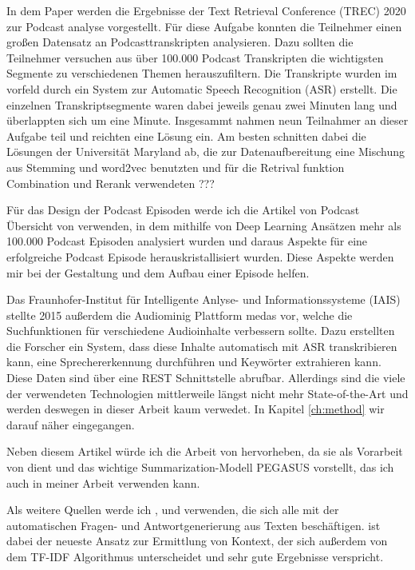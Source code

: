 In dem Paper \cite{jones2021} werden die Ergebnisse der Text Retrieval Conference (TREC) 2020 zur Podcast analyse vorgestellt.
Für diese Aufgabe konnten die Teilnehmer einen großen Datensatz an Podcasttranskripten analysieren.
Dazu sollten die Teilnehmer versuchen aus über 100.000 Podcast Transkripten die wichtigsten Segmente zu verschiedenen Themen herauszufiltern.
Die Transkripte wurden im vorfeld durch ein System zur Automatic Speech Recognition (ASR) erstellt.
Die einzelnen Transkriptsegmente waren dabei jeweils genau zwei Minuten lang und überlappten sich um eine Minute.
Insgesammt nahmen neun Teilnahmer an dieser Aufgabe teil und reichten eine Lösung ein.
Am besten schnitten dabei die Lösungen der Universität Maryland ab, die zur Datenaufbereitung eine  Mischung aus Stemming und word2vec benutzten und für die Retrival funktion Combination und Rerank verwendeten ???



Für das Design der Podcast Episoden werde ich die Artikel von Podcast Übersicht von \cite{jones2021} verwenden, in dem mithilfe von Deep Learning Ansätzen mehr als 100.000 Podcast Episoden analysiert wurden und daraus Aspekte für eine erfolgreiche Podcast Episode herauskristallisiert wurden. Diese Aspekte werden mir bei der Gestaltung und dem Aufbau einer Episode helfen. 


Das Fraunhofer-Institut für Intelligente Anlyse- und Informationssysteme (IAIS) stellte 2015 außerdem die Audiominig Plattform medas vor, welche die Suchfunktionen für verschiedene Audioinhalte verbessern sollte.
Dazu erstellten die Forscher ein System, dass diese Inhalte automatisch mit ASR transkribieren kann, eine Sprechererkennung durchführen und Keywörter extrahieren kann.
Diese Daten sind über eine REST Schnittstelle abrufbar.
Allerdings sind die viele der verwendeten Technologien mittlerweile längst nicht mehr State-of-the-Art und werden deswegen in dieser Arbeit kaum verwedet.
In Kapitel \autoref{ch:method} wir darauf näher eingegangen.
\cite{maroni2020}





Neben diesem Artikel würde ich die Arbeit von \cite{zhang2020} hervorheben, da sie als Vorarbeit von \cite{laban2022} dient und das wichtige Summarization-Modell PEGASUS vorstellt, das ich auch in meiner Arbeit verwenden kann. 

Als weitere Quellen werde ich \cite{karpukhin2020}, \cite{reddy2019} und \cite{choi2018} verwenden, die sich alle mit der automatischen Fragen- und Antwortgenerierung aus Texten beschäftigen.
\cite{karpukhin2020} ist dabei der neueste Ansatz zur Ermittlung von Kontext, der sich außerdem von dem TF-IDF Algorithmus unterscheidet und sehr gute Ergebnisse verspricht.




